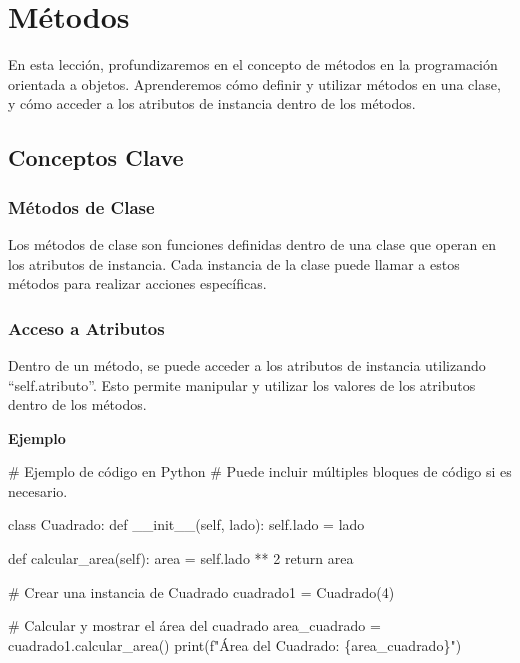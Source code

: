 \documentclass[
  a4paper,
  DIV=11,
  numbers=noendperiod,
  onepage,
  openany]{scrreprt}
\newenvironment{Shaded}{\begin{snugshade}}{\end{snugshade}}
\newcommand{\BuiltInTok}[1]{\textcolor[rgb]{0.00,0.23,0.31}{#1}}
\newcommand{\CommentTok}[1]{\textcolor[rgb]{0.37,0.37,0.37}{#1}}
\newcommand{\ControlFlowTok}[1]{\textcolor[rgb]{0.00,0.23,0.31}{#1}}
\newcommand{\DecValTok}[1]{\textcolor[rgb]{0.68,0.00,0.00}{#1}}
\newcommand{\FunctionTok}[1]{\textcolor[rgb]{0.28,0.35,0.67}{#1}}
\newcommand{\KeywordTok}[1]{\textcolor[rgb]{0.00,0.23,0.31}{#1}}
\newcommand{\NormalTok}[1]{\textcolor[rgb]{0.00,0.23,0.31}{#1}}
\newcommand{\OperatorTok}[1]{\textcolor[rgb]{0.37,0.37,0.37}{#1}}
\newcommand{\SpecialCharTok}[1]{\textcolor[rgb]{0.37,0.37,0.37}{#1}}
\newcommand{\SpecialStringTok}[1]{\textcolor[rgb]{0.13,0.47,0.30}{#1}}
\newcommand{\VariableTok}[1]{\textcolor[rgb]{0.07,0.07,0.07}{#1}}
\begin{document}
\chapter{Métodos}\label{muxe9todos-1}

En esta lección, profundizaremos en el concepto de métodos en la
programación orientada a objetos. Aprenderemos cómo definir y utilizar
métodos en una clase, y cómo acceder a los atributos de instancia dentro
de los métodos.

\section{Conceptos Clave}\label{conceptos-clave-22}

\subsection{Métodos de Clase}\label{muxe9todos-de-clase}

Los métodos de clase son funciones definidas dentro de una clase que
operan en los atributos de instancia. Cada instancia de la clase puede
llamar a estos métodos para realizar acciones específicas.

\subsection{Acceso a Atributos}\label{acceso-a-atributos}

Dentro de un método, se puede acceder a los atributos de instancia
utilizando ``self.atributo''. Esto permite manipular y utilizar los
valores de los atributos dentro de los métodos.

\textbf{Ejemplo}

\begin{Shaded}
\begin{Highlighting}[]
\CommentTok{\# Ejemplo de código en Python}
\CommentTok{\# Puede incluir múltiples bloques de código si es necesario.}

\KeywordTok{class}\NormalTok{ Cuadrado:}
    \KeywordTok{def} \FunctionTok{\_\_init\_\_}\NormalTok{(}\VariableTok{self}\NormalTok{, lado):}
        \VariableTok{self}\NormalTok{.lado }\OperatorTok{=}\NormalTok{ lado}

    \KeywordTok{def}\NormalTok{ calcular\_area(}\VariableTok{self}\NormalTok{):}
\NormalTok{        area }\OperatorTok{=} \VariableTok{self}\NormalTok{.lado }\OperatorTok{**} \DecValTok{2}
        \ControlFlowTok{return}\NormalTok{ area}

\CommentTok{\# Crear una instancia de Cuadrado}
\NormalTok{cuadrado1 }\OperatorTok{=}\NormalTok{ Cuadrado(}\DecValTok{4}\NormalTok{)}

\CommentTok{\# Calcular y mostrar el área del cuadrado}
\NormalTok{area\_cuadrado }\OperatorTok{=}\NormalTok{ cuadrado1.calcular\_area()}
\BuiltInTok{print}\NormalTok{(}\SpecialStringTok{f"Área del Cuadrado: }\SpecialCharTok{\{}\NormalTok{area\_cuadrado}\SpecialCharTok{\}}\SpecialStringTok{"}\NormalTok{)}
\end{Highlighting}
\end{Shaded}
\end{document}
